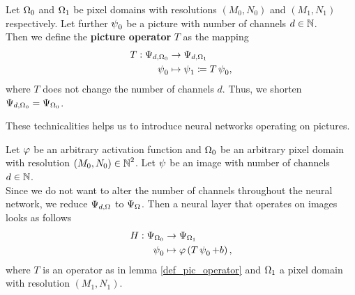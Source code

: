 \begin{definition}\label{def_pic_operator}
Let $\Omega_0$ and $\Omega_1$ be pixel domains with resolutions $(M_0,N_0)$ and $(M_1,N_1)$ respectively. Let further $\operatorname{\psi}_0$ be a picture with number of channels $d\in\operatorname{\mathbb{N}}$.\\ Then we define the \textbf{picture operator} $T$ as the mapping
\begin{align*}
T: \Psi_{d,\Omega_0} &\to \Psi_{d,\Omega_1}\\
\operatorname{\psi}_0 &\mapsto \operatorname{\psi}_1 \coloneqq T \operatorname{\psi}_0,
\end{align*}
where $T$ does not change the number of channels $d$. Thus, we shorten $\Psi_{d,\Omega_0}= \Psi_{\Omega_0}$.
\end{definition}

These technicalities helps us to introduce neural networks operating on pictures.

\begin{corollary}
Let $\operatorname{\varphi}$ be an arbitrary activation function and $\Omega_0$ be an arbitrary pixel domain with resolution $(M_0,N_0)\in\operatorname{\mathbb{N}}^2$. Let $\operatorname{\psi}$ be an image with number of channels $d\in\operatorname{\mathbb{N}}$.\\
Since we do not want to alter the number of channels throughout the neural network, we reduce $\Psi_{d,\Omega}$ to $\Psi_{\Omega}$. Then a neural layer that operates on images looks as follows
\begin{align*}
H: \Psi_{\Omega_0} &\to \Psi_{\Omega_1}\\
\operatorname{\psi}_0 &\mapsto \operatorname{\varphi}\left(T\operatorname{\psi}_0 + b\right),
\end{align*}
where $T$ is an operator as in lemma \ref{def_pic_operator} and $\Omega_1$ a pixel domain with resolution $(M_1,N_1)$.

\end{corollary}
